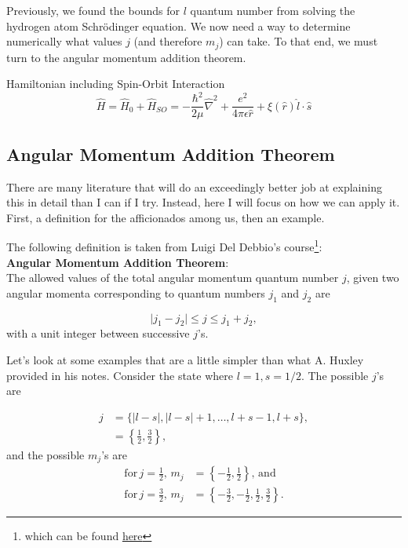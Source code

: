 \documentclass{article}
\numberwithin{equation}{section} %
\begin{document}
Previously, we found the bounds for $l$ quantum number from solving the hydrogen atom Schr\"odinger equation. We now need a way to determine numerically what values $j$ (and therefore $m_j$) can take. To that end, we must turn to the angular momentum addition theorem. \\




\begin{tcolorbox}[colback=pink]
Hamiltonian including Spin-Orbit Interaction
\begin{equation}
\hat{H}= \hat{H}_0 + \hat{H}_{SO} = -\frac{\hbar^2}{2\mu}\hat{\nabla}^2 + \frac{e^2}{4\pi\epsilon \hat{r}} +  \xi(\hat{r})\hat{l}\cdot\hat{s}
\end{equation}
\end{tcolorbox}

\subsection{Angular Momentum Addition Theorem}

There are many literature that will do an exceedingly better job at explaining this in detail than I can if I try. Instead, here I will focus on how we can apply it. First, a definition for the afficionados among us, then an example. 

The following definition is taken from Luigi Del Debbio's course\footnote{which can be found \href{https://www2.ph.ed.ac.uk/~ldeldebb/docs/QM/lect15.pdf}{here}}:\\

\noindent\textbf{Angular Momentum Addition Theorem}:\\
The allowed values of the total angular momentum quantum number $j$, given two angular momenta corresponding to quantum numbers $j_1$ and $j_2$ are

\begin{equation}
\vert j_1-j_2\vert \leq j \leq j_1+j_2 ,
\end{equation}
with a unit integer between successive $j$'s.

Let's look at some examples that are a little simpler than what A. Huxley provided in his notes. Consider the state where $l=1, s=1/2$. The possible $j$'s are

\begin{equation}
\begin{split}
j&=\{\vert l-s\vert,\vert l-s\vert +1,\dots,l+s-1,l+s \},\\
&=\left\{\frac{1}{2},\frac{3}{2} \right\},
\end{split}
\end{equation}
and the possible $m_j$'s are
\begin{equation}
\begin{split}
\text{for}\, j=\frac{1}{2},\, m_j&=\left\{-\frac{1}{2},\frac{1}{2} \right\},\,\text{and}\\
\text{for}\,j=\frac{3}{2},\, m_j&=\left\{-\frac{3}{2},-\frac{1}{2},\frac{1}{2},\frac{3}{2} \right\}.
\end{split}
\end{equation}
\end{document}
